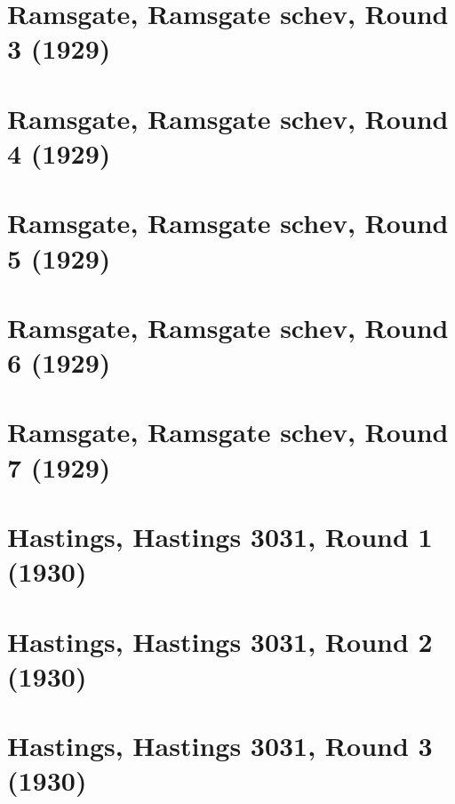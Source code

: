\documentclass[11pt]{article}
\begin{document}
\section{Ramsgate, Ramsgate schev, Round 3 (1929)}


\clearpage

\section{Ramsgate, Ramsgate schev, Round 4 (1929)}


\clearpage

\section{Ramsgate, Ramsgate schev, Round 5 (1929)}


\clearpage

\section{Ramsgate, Ramsgate schev, Round 6 (1929)}


\clearpage

\section{Ramsgate, Ramsgate schev, Round 7 (1929)}


\clearpage

\section{Hastings, Hastings 3031, Round 1 (1930)}


\clearpage

\section{Hastings, Hastings 3031, Round 2 (1930)}


\clearpage

\section{Hastings, Hastings 3031, Round 3 (1930)}


\clearpage
\end{document}
